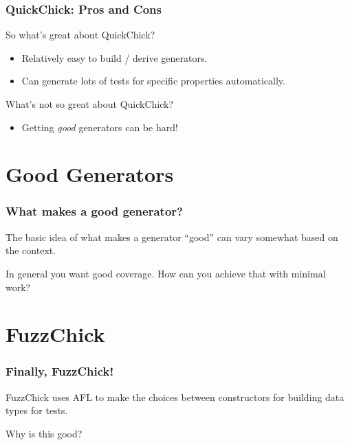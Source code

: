 \documentclass{beamer}
\begin{document}
\begin{frame}
  \frametitle{QuickChick: Pros and Cons}

  So what's great about QuickChick?\\

  \begin{itemize}
  \item Relatively easy to build / derive generators.
  \item Can generate lots of tests for specific properties
    automatically.
  \end{itemize}

  \pause

  What's not so great about QuickChick?\\

  \pause

  \begin{itemize}
  \item Getting \emph{good} generators can be hard!
  \end{itemize}
\end{frame}

\section{Good Generators}

\begin{frame}
  \frametitle{What makes a good generator?}

  The basic idea of what makes a generator ``good'' can vary somewhat
  based on the context. \\

  \pause

  In general you want good coverage. How can you achieve that with
  minimal work?
\end{frame}

\section{FuzzChick}

\begin{frame}
  \frametitle{Finally, FuzzChick!}

  FuzzChick uses AFL to make the choices between constructors for
  building data types for tests.\\

  \pause

  Why is this good?

\end{frame}
\end{document}
